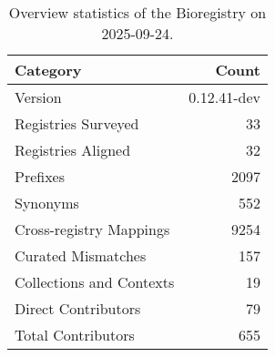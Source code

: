 \begin{table}
\caption{Overview statistics of the Bioregistry on 2025-09-24.}
\label{tab:bioregistry-summary}
\begin{tabular}{lr}
\toprule
Category & Count \\
\midrule
Version & 0.12.41-dev \\
Registries Surveyed & 33 \\
Registries Aligned & 32 \\
Prefixes & 2097 \\
Synonyms & 552 \\
Cross-registry Mappings & 9254 \\
Curated Mismatches & 157 \\
Collections and Contexts & 19 \\
Direct Contributors & 79 \\
Total Contributors & 655 \\
\bottomrule
\end{tabular}
\end{table}

